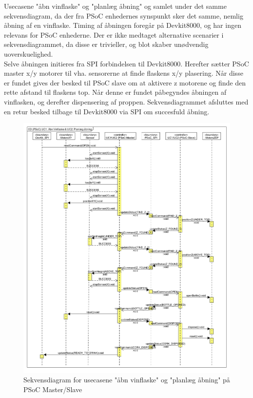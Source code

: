 Usecasene "åbn vinflaske" og "planlæg åbning" og samlet under det samme sekvensdiagram, da der fra PSoC enhedernes synspunkt sker det samme, nemlig 
åbning af en vinflaske. Timing af åbningen foregår på Devkit8000, og har ingen relevans for PSoC enhederne. Der er ikke medtaget alternative scenarier i 
sekvensdiagrammet, da disse er trivieller, og blot skaber unødvendig uoverskuelighed.\\

Selve åbningen initieres fra SPI forbindelsen til Devkit8000. Herefter
sætter PSoC master x/y motorer til vha. sensorerne at finde flaskens x/y plasering. Når disse er fundet gives der besked til PSoC slave om at aktivere z motorene
og finde den rette afstand til flaskens top. Når denne er fundet påbegyndes åbningen af vinflasken, og derefter dispensering af proppen. Sekvensdiagrammet
afsluttes med en retur besked tilbage til Devkit8000 via SPI om succesfuld åbning.\\

\begin{figure}[H]
\includegraphics[scale=0.4]{tex/Arkitektur/Fotos/SW/Sekvendiagram_PSoC}
\caption{Sekvensdiagram for usecasene "åbn vinflaske" og "planlæg åbning" på PSoC Master/Slave}
\end{figure}
